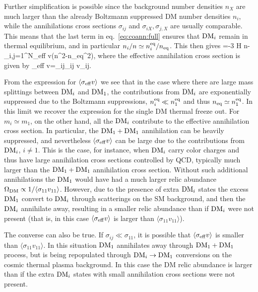 Further simplification is possible since the background number densities $n_X$ are much larger than the already Boltzmann suppressed DM number densities $n_i$, while the annihilations cross sections $\sigma_{ij}$ and $\sigma_{iX}, \sigma_{j,X}$ are usually comparable. This means that the last term in eq.~\eqref{eq:coann:full} ensures that ${\rm DM}_i$ remain in thermal equilibrium, and in particular $n_i/n\simeq n_i^{\rm eq} /n_{\rm eq}$. This then gives
\beq
{}=-3 H n-\sum_{i,j=1}^N\langle \sigma_{\rm eff} v\rangle \big(n^2-n_{\rm eq}^2\big),
\eeq
where the effective annihilation cross section is given by 
\beq
\langle \sigma_{\rm eff} v\rangle=\sum_{ij}\langle \sigma_{ij} v_{ij}\rangle {}.
\eeq

From the expression for $\langle \sigma_{\rm eff} v\rangle$ we see that in the case where there are large mass splittings between ${\rm DM}_i$ and ${\rm DM}_1$, the contributions from ${\rm DM}_i$ are exponentially suppressed due to the Boltzmann suppressions, $n_i^{\rm eq}\ll n_1^{\rm eq}$ and thus $n_{\rm eq}\simeq n_1^{\rm eq}$. In this limit we recover the expression for the single DM thermal freeze out. For $m_i\simeq m_1$, on the other hand, all the ${\rm DM}_i$ contribute to the effective annihilation cross section. In particular, the ${\rm DM}_1 +{\rm DM}_1$ annihilation can be heavily suppressed, and nevertheless  $\langle \sigma_{\rm eff} v\rangle$ can be large due to the contributions from ${\rm DM}_i$, $i\ne 1$.  This is the case, for instance, when ${\rm DM}_i$ carry color charges and thus have large annihilation cross sections controlled by QCD, typically much larger than the ${\rm DM}_1+ {\rm DM}_1$ annihilation cross section. Without such additional annihilations the ${\rm DM}_1$ would have had a much larger relic abundance $\Omega_{\rm DM}\propto 1/\langle \sigma_{11} v_{11}\rangle$. However, due to the presence of extra  ${\rm DM}_i$ states the excess ${\rm DM}_1$ convert to ${\rm DM}_i$ through scatterings on the SM background, and then the ${\rm DM}_i$ annihilate away, resulting in a smaller relic abundance  than if ${\rm DM}_i$ were not present (that is, in this case $\langle \sigma_{\rm eff} v\rangle$ is larger than $\langle \sigma_{11} v_{11}\rangle$). 

The converse can also be true. If $ \sigma_{ij}\ll  \sigma_{11}$, it is possible that $\langle \sigma_{\rm eff} v\rangle$ is smaller than $\langle \sigma_{11} v_{11}\rangle$. In this situation ${\rm DM}_1$ annihilates away through  ${\rm DM}_1+{\rm DM}_1$ process, but is being repopulated through ${\rm DM}_i\to {\rm DM}_1$ conversions on the cosmic thermal plasma background. In this case the DM relic abundance is larger than if the extra ${\rm DM}_i$ states with small annihilation cross sections were not present. 


